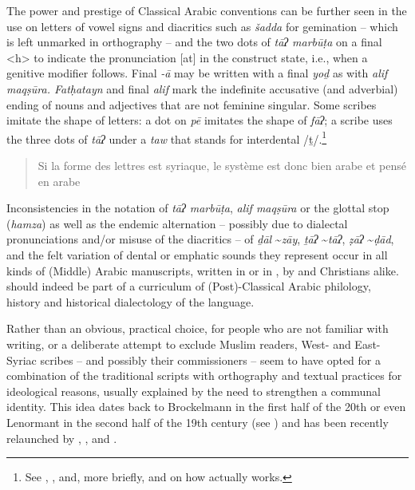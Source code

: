 \documentclass[output=paper,colorlinks,citecolor=brown,arabfont,syriacfont]{langscibook}
\begin{document}
The power and prestige of Classical Arabic conventions can be further seen in the use on  letters of  vowel signs and diacritics such as \textit{šadda} for gemination -- which is left unmarked in  orthography -- and the two dots of  \textit{tāʔ marbūṭa} on a  final <h> to indicate the pronunciation [at] in the construct state, i.e., when a genitive modifier follows. Final \textit{-ā} may be written with a  final \textit{yoḏ} as with  \textit{alif maqṣūra. Fatḥatayn} and final \textit{alif} mark the indefinite accusative (and adverbial) ending of nouns and adjectives that are not feminine singular. Some scribes imitate the shape of  letters: a dot on  \textit{pē} imitates the shape of  \textit{fāʔ}; a scribe uses the three dots of  \textit{tāʔ} under a  \textit{taw} that stands for interdental /ṯ/.\footnote{%
See \citet[294--298]{kiraz2012}, \citet[228--234]{mccollum2014}, \citet{erdman2021} and, more briefly, \citet[299--300]{mengozzi2010} and \citet[68]{briquel_chatonnet2015} on how  actually works.}

\begin{quote}
Si la forme des lettres est syriaque, le système est donc bien arabe et pensé en arabe \citep[469]{briquel_chatonnet2005}
\end{quote}

Inconsistencies in the notation of \textit{tāʔ marbūṭa}, \textit{alif maqṣūra} or the glottal stop (\textit{hamza}) as well as the endemic alternation -- possibly due to dialectal pronunciations and/or misuse of the diacritics -- of \textit{ḏāl} \textasciitilde \textit{zāy}, \textit{ṯāʔ} \textasciitilde \textit{tāʔ}, \textit{ẓāʔ} \textasciitilde \textit{ḍād}, and the felt variation of dental or emphatic sounds they represent occur in all kinds of (Middle) Arabic manuscripts, written in   or in , by  and Christians alike.  should indeed be part of a curriculum of (Post)-Classical Arabic philology, history and historical dialectology of the  language.

Rather than an obvious, practical choice, for people who are not familiar with  writing, or a deliberate attempt to exclude Muslim readers, West- and East-Syriac scribes -- and possibly their commissioners -- seem to have opted for a combination of the traditional  scripts with  orthography and textual practices for ideological reasons, usually explained by the need to strengthen a communal identity. This idea dates back to Brockelmann in the first half of the 20th or even Lenormant in the second half of the 19th century (see \citealt[187]{braida2012}) and has been recently relaunched by \citet{del_rio_sanchez2004}, \citet{briquel_chatonnet2005}, and \citet{mengozzi2010}.
\end{document}

